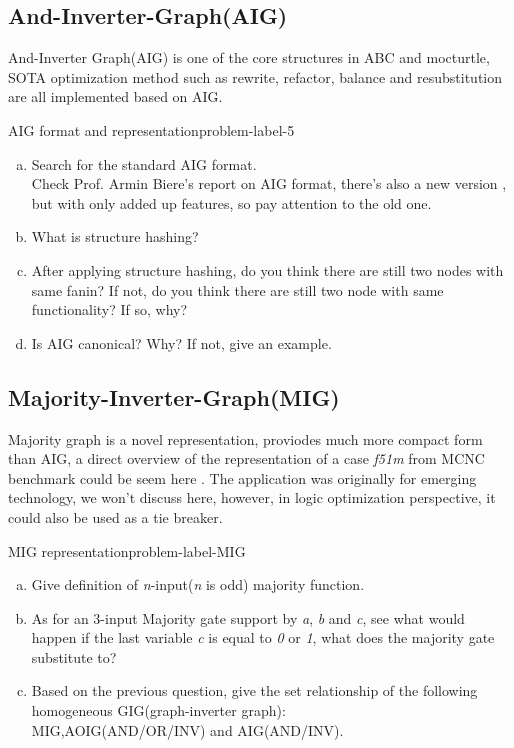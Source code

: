 \documentclass[main.tex]{subfiles}
\begin{document}
\subsection{And-Inverter-Graph(AIG)}
And-Inverter Graph(AIG) is one of the core structures in ABC and mocturtle, SOTA optimization method such as rewrite, refactor, balance and resubstitution are all implemented based on AIG.
\begin{problem}{AIG format and representation}{problem-label-5}
\begin{enumerate}[(a)]
    \item Search for the standard AIG format.\\
    Check Prof. Armin Biere's report \cite{AIGERFormat} on AIG format, there's also a new version \cite{Biere-FMV-TR-11-2}, but with only added up features, so pay attention to the old one.
    \item What is structure hashing? 
    \item After applying structure hashing, do you think there are still two nodes with same fanin? If not, do you think there are still two node with same functionality? If so, why?
    \item Is AIG canonical? Why? If not, give an example.
\end{enumerate}
\end{problem}
\vspace*{4\baselineskip}


\subsection{Majority-Inverter-Graph(MIG)}
Majority graph is a novel representation, proviodes much more compact form than AIG, a direct overview of the representation of a case \textit{f51m} from MCNC benchmark could be seem here \cite{MIGOri}. The application was originally for emerging technology, we won't discuss here, however, in logic optimization perspective, it could also be used as a tie breaker. 
\begin{problem}{MIG representation}{problem-label-MIG}
\begin{enumerate}[(a)]
    \item Give definition of \textit{n}-input(\textit{n} is odd) majority function.
    \item As for an 3-input Majority gate support by \textit{a}, \textit{b} and  \textit{c}, see what would happen if the last variable \textit{c} is equal to \textit{0} or \textit{1}, what does the majority gate substitute to?
    \item Based on the previous question, give the set relationship of the following homogeneous GIG(graph-inverter graph):\\
    MIG,AOIG(AND/OR/INV) and AIG(AND/INV).
\end{enumerate}
\end{problem}
\vspace*{4\baselineskip}
\end{document}
